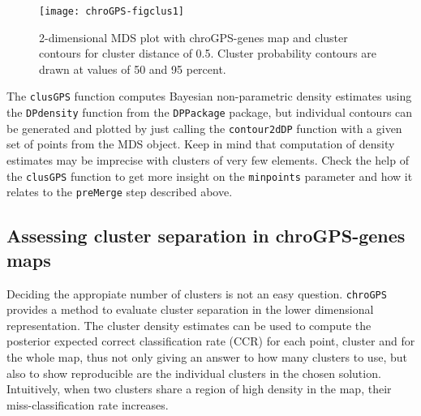 \documentclass[a4paper,12pt,nogin]{article}
\newcommand{\newtext}[1]{{\color{blue} #1}} %
\begin{document}
\begin{figure}
\begin{center}
\texttt{[image: chroGPS-figclus1]}
\end{center}
\caption{2-dimensional MDS plot with chroGPS-genes map and cluster
  contours for cluster distance of 0.5. Cluster probability contours
  are drawn at values of 50 and 95  percent.}
\label{fig:clus1}
\end{figure}

The \texttt{clusGPS} function computes 
Bayesian non-parametric density estimates using the \texttt{DPdensity}
function from the \texttt{DPPackage} package, but individual contours can be
generated and plotted by just calling the \texttt{contour2dDP}
function with a given set of points from the MDS object. 
Keep in mind that computation of density estimates
may \newtext{be imprecise} 
with clusters of very few elements. Check the help of the
\texttt{clusGPS} function to get more insight on the \texttt{minpoints} parameter and how it relates to the \texttt{preMerge} step described above.

\subsection{Assessing cluster separation in chroGPS-genes maps}
\label{sec:clusGPS2}


Deciding the appropiate number of clusters is not an easy question.
\texttt{chroGPS}
provides a method to evaluate \newtext{cluster separation in the}
lower dimensional representation.
\newtext{The cluster density estimates} can be used to compute the posterior expected
correct classification rate (CCR) for each point, cluster and for the whole map,
thus not only giving an answer to how many clusters to use, but also
to show reproducible are the individual clusters in the chosen
solution. Intuitively, when two clusters share a region of high
density in the map, their miss-classification rate increases. %
\end{document}
